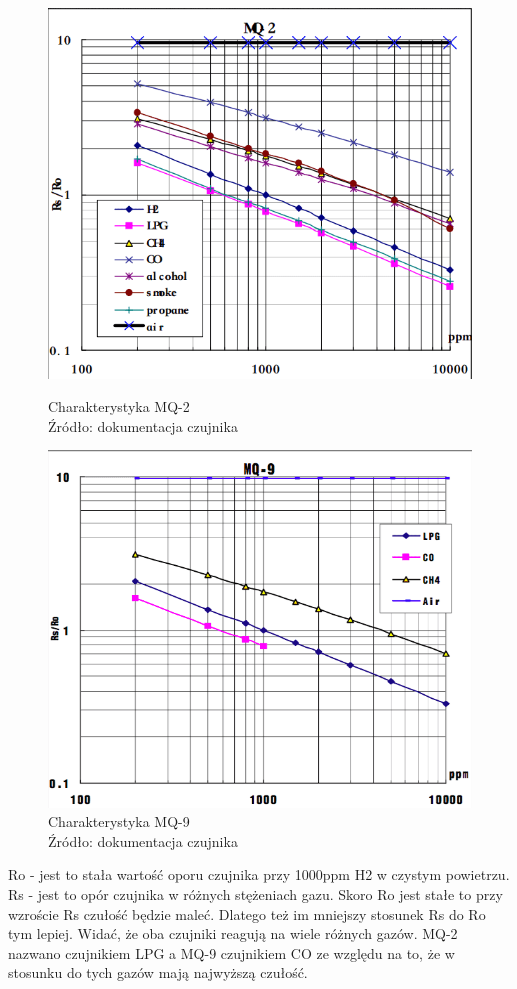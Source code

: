\begin{figure}[H]
\centering
\begin{minipage}{.4\linewidth}
    \includegraphics[width=\linewidth]{MQ2}
    \caption{Charakterystyka MQ-2\\Źródło: dokumentacja czujnika}
    \label{img1}
\end{minipage}
\hspace{.05\linewidth}
\begin{minipage}{.4\linewidth}
    \includegraphics[width=\linewidth]{MQ9}
    \caption{Charakterystyka MQ-9\\Źródło: dokumentacja czujnika}
    \label{img2}
\end{minipage}
\end{figure} 
Ro - jest to stała wartość oporu czujnika przy 1000ppm H2 w czystym powietrzu.
Rs - jest to opór czujnika w różnych stężeniach gazu.
Skoro Ro jest stałe to przy wzroście Rs czułość będzie maleć. Dlatego też im mniejszy stosunek Rs do Ro tym lepiej. Widać, że oba czujniki reagują na wiele różnych gazów. MQ-2 nazwano czujnikiem LPG a MQ-9 czujnikiem CO ze względu na to, że w stosunku do tych gazów mają najwyższą czułość.  

